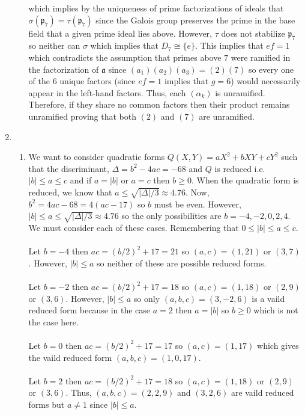 \documentclass[12pt]{extarticle}
\begin{document}
\begin{enumerate}
\begin{enumerate}
which implies by the uniqueness of prime factorizations of ideals that $\sigma(\mathfrak{p}_7) = \tau(\mathfrak{p}_7)$ since the Galois group preserves the prime in the base field that a given prime ideal lies above. However, $\tau$ does not stabilize $\mathfrak{p}_7$ so neither can $\sigma$ which implies that $D_7 \cong \{e\}$. This implies that $ef = 1$ which contradicts the assumption that primes above $7$ were ramified in the factorization of $\mathfrak{a}$ since $(a_1)(a_2)(a_3) = (2)(7)$ so every one of the $6$ unique factors (since $ef = 1$ implies that $g = 6$) would necessarily appear in the left-hand factors. Thus, each $(\alpha_k)$ is unramified. Therefore, if they share no common factors then their product remains unramified proving that both $(2)$ and $(7)$ are unramified.   
\end{enumerate}
\item
\begin{enumerate}
\item We want to consider quadratic forms $Q(X, Y) = a X^2 + b XY + c Y^2$ such that the discriminant, $\Delta = b^2 - 4ac = - 68$ and $Q$ is reduced i.e. $|b| \le a \le c$ and if $a = |b|$ or $a = c$ then $b \ge 0$. When the quadratic form is reduced, we know that $a \le \sqrt{|\Delta|/3} \approx 4.76$. Now, $b^2 = 4ac - 68 = 4(ac - 17)$ so $b$ must be even. However, $|b| \le a \le \sqrt{|\Delta|/3} \approx 4.76$ so the only possibilities are $b = -4, -2 , 0 , 2, 4$. We must consider each of these cases. 
Remembering that $0 \le |b| \le a \le c$.\\\\
Let $b = -4$ then $ac = (b/2)^2 + 17 = 21$ so $(a,c) = (1, 21)$ or $(3, 7)$. However, $|b| \le a$ so neither of these are possible reduced forms.     \\\\
Let $b = -2$ then $ac = (b/2)^2 + 17 = 18$ so $(a,c) = (1, 18)$ or $(2, 9)$ or $(3, 6)$. However, $|b| \le a$ so only $(a,b,c) = (3, -2, 6)$ is a vaild reduced form because in the case $a = 2$ then $a = |b|$ so $b \ge 0$ which is not the case here.\\\\
Let $b = 0$ then $ac = (b/2)^2 + 17 = 17$ so $(a,c) = (1, 17)$ which gives the vaild reduced form $(a, b, c) = (1, 0, 17)$. \\\\
Let $b = 2$ then $ac = (b/2)^2 + 17 = 18$ so $(a,c) = (1, 18)$ or $(2, 9)$ or $(3, 6)$. Thus, $(a,b,c) = (2, 2, 9)$ and $(3, 2, 6)$ are vaild reduced forms but $a \neq 1$ since $|b| \le a$. \\\\


\end{enumerate}
\end{enumerate}
\end{document}
